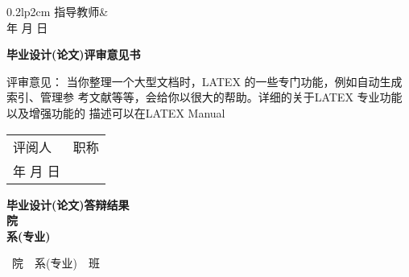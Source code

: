 \begin{minipage}[t]{1\linewidth} 
\hskip 11cm
\begin{tabular*}{0.2\linewidth}{lp{2cm}}
指导教师&\\
\quad 年  \quad 月 \quad 日\\
\end{tabular*}
 \end{minipage}



\begin{center}
\huge\bfseries
毕业设计(论文)评审意见书
\vspace{\ccwd}
\end{center}


\begin{ulfield1}[7]{评审意见：}
当你整理一个大型文档时，LATEX 的一些专门功能，例如自动生成索引、管理参
考文献等等，会给你以很大的帮助。详细的关于LATEX 专业功能以及增强功能的
描述可以在LATEX Manual
\end{ulfield1}


\begin{minipage}[t]{1\linewidth} 
\hskip 8cm
\begin{tabular*}{0.2\linewidth}{lp{2cm}}
评阅人            &   职称  \\
\quad 年  \quad 月 \quad 日\\
\end{tabular*}
 \end{minipage}
 

 
   
\newpage
{}\ccwd
\begin{center}
\vspace{\ccwd}
{\huge\bfseries   毕业设计(论文)答辩结果 } \\
{ \bfseries  \LARGE    \myunderline[5]{}    院          \\                      
                                 \myunderline[5]{}   系(专业)   \\}

\vspace{\ccwd}
\end{center}
\par\noindent\myunderline[10]{\@college}~院~\myunderline[10]{\@department}~系(专业)~\myunderline[8]{\@class}~班
\vspace{2\ccwd}

